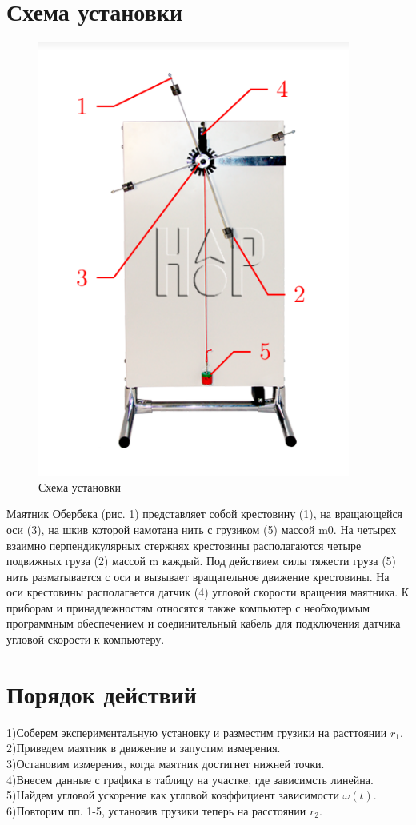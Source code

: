 \documentclass[12pt]{article}
\begin{document}
	\section{Схема установки}
	\begin{figure}[H]
		\centering
		\includegraphics[scale=0.5]{scheme}
		\caption{Схема установки}
	\end{figure}
	Маятник Обербека (рис. 1) представляет собой крестовину (1), на вращающейся оси (3),
на шкив которой намотана нить с грузиком (5)
массой m0. На четырех взаимно перпендикулярных стержнях крестовины располагаются четыре подвижных груза (2) массой m каждый. Под действием силы тяжести груза (5)
нить разматывается с оси и вызывает вращательное движение крестовины. На оси крестовины располагается датчик (4) угловой скорости вращения маятника.	К приборам и принадлежностям 		относятся
также компьютер с необходимым программным обеспечением и 					соединительный кабель
для подключения датчика угловой скорости к
компьютеру.
	\section{Порядок действий}
	1)Соберем экспериментальную установку и разместим грузики на расттоянии $r_1$.\\
	2)Приведем маятник в движение и запустим измерения.\\
	3)Остановим измерения, когда маятник достигнет нижней точки.\\
	4)Внесем данные с графика в таблицу на участке, где зависимсть линейна.\\
	5)Найдем угловой ускорение как угловой коэффициент зависимости $\omega(t)$.\\
	6)Повторим пп. 1-5, установив грузики теперь на расстоянии $r_2$.\\
\end{document}
